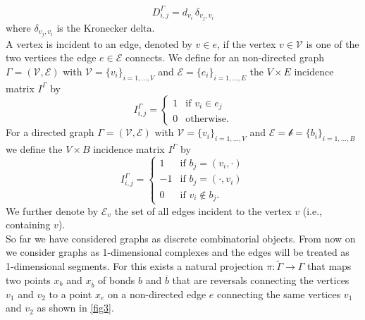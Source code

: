 \begin{equation}
    \label{degree matrix}
    D^{\Gamma}_{i, j} = d_{v_i} \, \delta_{v_j, v_i}
\end{equation}
where $\delta_{v_j, v_i}$ is the Kronecker delta. \\
A vertex is incident to an edge, denoted by $v \in e$, if the vertex $v \in \mathcal{V}$ is one of the two vertices the edge $e \in \mathcal{E}$ connects. We define for an non-directed graph $\Gamma = (\mathcal{V}, \mathcal{E})$ with $\mathcal{V} = \{v_i\}_{i = 1, \ldots, V}$ and $\mathcal{E} = \{e_i\}_{i = 1, \ldots, E}$ the $V \times E$ incidence matrix $I^{\Gamma}$ by  
\begin{equation}
    \label{incidence matrix non-directed}
    I^{\Gamma}_{i, j}= \begin{cases} 1 & \text{if } v_i \in e_j \\ 0 & \text{otherwise.} \end{cases}
\end{equation}
For a directed graph $\Gamma = (\mathcal{V}, \mathcal{E})$ with $\mathcal{V} = \{v_i\}_{i = 1, \ldots, V}$ and $\mathcal{E} = \mathcal{b} = \{b_i\}_{i = 1, \ldots, B}$ we define the $V \times B$ incidence matrix $I^{\Gamma}$ by 
\begin{equation}
    \label{incidence matrix directed}
    I^{\Gamma}_{i, j}= \begin{cases} 1 & \text{if } b_j = (v_i, \cdot) \\ -1 & \text{if } b_j = (\cdot, v_i) \\ 0 & \text{if } v_i \notin b_j. \end{cases}
\end{equation}
We further denote by $\mathcal{E}_v$ the set of all edges incident to the vertex $v$ (i.e., containing $v$). \\

So far we have considered graphs as discrete combinatorial objects. From now on we consider graphs as 1-dimensional complexes and the edges will be treated as 1-dimensional segments. For this exists a natural projection $\pi \colon \widetilde{\Gamma} \to \Gamma$ that maps two points $x_b$ and $x_{\overline{b}}$ of bonds $b$ and $\overline{b}$ that are reversals connecting the vertices $v_1$ and $v_2$ to a point $x_e$ on a non-directed edge $e$ connecting the same vertices $v_1$ and $v_2$ as shown in \cref{fig3}.

